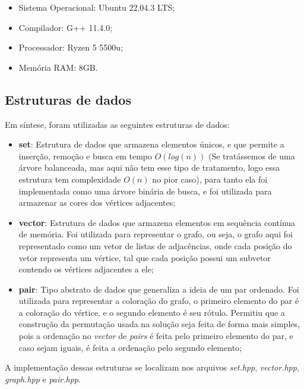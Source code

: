 \documentclass{article}
\begin{document}
\begin{itemize}
    \item Sistema Operacional: Ubuntu 22.04.3 LTS;
    \item Compilador: G++ 11.4.0;
    \item Processador: Ryzen 5 5500u;
    \item Memória RAM: 8GB.
\end{itemize}


\subsection{Estruturas de dados}

Em síntese, foram utilizadas as seguintes estruturas de dados:

\begin{itemize}
    \item \textbf{set}: Estrutura de dados que armazena elementos únicos, e que permite a inserção, remoção e busca em tempo $O(log(n))$ (Se tratássemos de uma árvore balanceada, mas aqui não tem esse tipo de tratamento, logo essa estrutura tem complexidade $O(n)$ no pior caso), 
    para tanto ela foi implementada como uma árvore binária de busca, e foi utilizada para armazenar as cores dos vértices adjacentes;    

    \item \textbf{vector}: Estrutura de dados que armazena elementos em sequência contínua de memória. Foi utilizada para representar o grafo, 
    ou seja, o grafo aqui foi representado como um vetor de listas de adjacências, onde cada posição do vetor representa um vértice, tal que cada 
    posição possui um subvetor contendo os vértices adjacentes a ele;

    \item \textbf{pair}: Tipo abstrato de dados que generaliza a ideia de um par ordenado. Foi utilizada para representar a coloração do grafo, 
    o primeiro elemento do par é a coloração do vértice, e o segundo elemento é seu rótulo. Permitiu que a construção da permutação usada na solução seja 
    feita de forma mais simples, pois a ordenação no \emph{vector} de \emph{pairs} é feita pelo primeiro elemento do par, e caso sejam iguais, é feita a ordenação pelo segundo elemento;

\end{itemize}

A implementação dessas estruturas se localizam nos arquivos \emph{set.hpp}, \emph{vector.hpp}, \emph{graph.hpp} e \emph{pair.hpp}.
\end{document}
